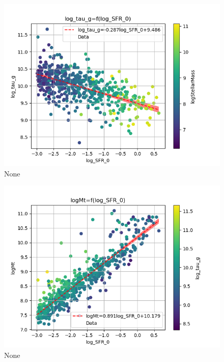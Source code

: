 \documentclass[a4paper,twocolumn]{article}
\begin{document}
\begin{figure}[!htpb]
\centering
\includegraphics[width=.9\linewidth]{./figs/log_SFR_0-log_tau_g-color_logStellarMass.png}
\caption{\label{fig:None}None}
\end{figure}
\begin{figure}[!htpb]
\centering
\includegraphics[width=.9\linewidth]{./figs/log_SFR_0-logMt-color_log_tau_g.png}
\caption{\label{fig:None}None}
\end{figure}


\pagebreak
\printbibliography
\end{document}
